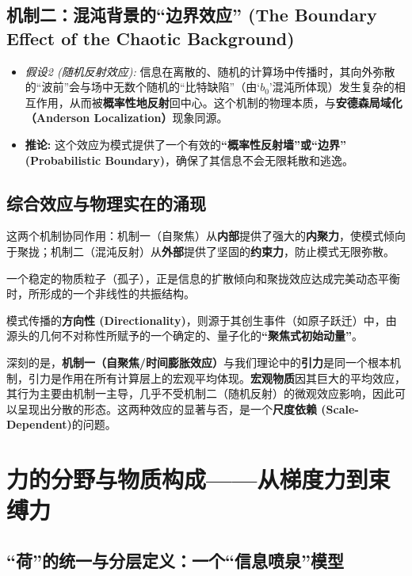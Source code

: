 \documentclass[12pt]{article}
\begin{document}
\subsection{机制二：混沌背景的``边界效应'' (The Boundary Effect of the Chaotic Background)}

\begin{itemize}
    \item \textit{假设2 (随机反射效应):} 信息在离散的、随机的计算场中传播时，其向外弥散的``波前''会与场中无数个随机的``比特缺陷''（由`$b_0$'混沌所体现）发生复杂的相互作用，从而被\textbf{概率性地反射}回中心。这个机制的物理本质，与\textbf{安德森局域化（Anderson Localization）}现象同源。
    
    \item \textbf{推论:} 这个效应为模式提供了一个有效的\textbf{``概率性反射墙''或``边界'' (Probabilistic Boundary)}，确保了其信息不会无限耗散和逃逸。
\end{itemize}


\subsection{综合效应与物理实在的涌现}

这两个机制协同作用：机制一（自聚焦）从\textbf{内部}提供了强大的\textbf{内聚力}，使模式倾向于聚拢；机制二（混沌反射）从\textbf{外部}提供了坚固的\textbf{约束力}，防止模式无限弥散。

一个稳定的物质粒子（孤子），正是信息的扩散倾向和聚拢效应达成完美动态平衡时，所形成的一个非线性的共振结构。

模式传播的\textbf{方向性 (Directionality)}，则源于其创生事件（如原子跃迁）中，由源头的几何不对称性所赋予的一个确定的、量子化的\textbf{``聚焦式初始动量''}。

深刻的是，\textbf{机制一（自聚焦/时间膨胀效应）}与我们理论中的\textbf{引力}是同一个根本机制，引力是作用在所有计算层上的宏观平均体现。\textbf{宏观物质}因其巨大的平均效应，其行为主要由机制一主导，几乎不受机制二（随机反射）的微观效应影响，因此可以呈现出分散的形态。这两种效应的显著与否，是一个\textbf{尺度依赖 (Scale-Dependent)}的问题。

\section{力的分野与物质构成——从梯度力到束缚力}

\subsection{“荷”的统一与分层定义：一个``信息喷泉''模型}
\end{document}
